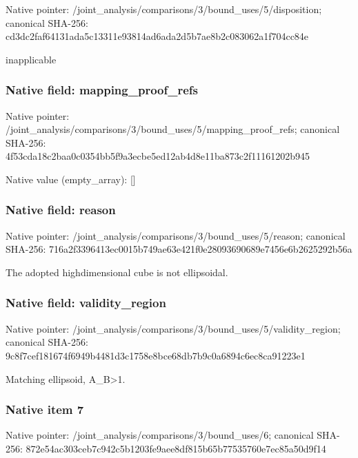 \documentclass[10pt,a4paper]{article}
\begin{document}
Native pointer: /joint\_analysis/comparis\allowbreak{}ons/3/bound\_uses/5/dispo\allowbreak{}sition; canonical SHA-256: cd3dc2faf64131ada5c13311\allowbreak{}e93814ad6ada2d5b7ae8b2c0\allowbreak{}83062a1f704cc84e


inapplicable


\subsubsection{Native field: mapping\_proof\_refs}


Native pointer: /joint\_analysis/comparis\allowbreak{}ons/3/bound\_uses/5/mappi\allowbreak{}ng\_proof\_refs; canonical SHA-256: 4f53cda18c2baa0c0354bb5f\allowbreak{}9a3ecbe5ed12ab4d8e11ba87\allowbreak{}3c2f11161202b945



Native value (empty\_array): []



\subsubsection{Native field: reason}


Native pointer: /joint\_analysis/comparis\allowbreak{}ons/3/bound\_uses/5/reaso\allowbreak{}n; canonical SHA-256: 716a2f3396413ec0015b749a\allowbreak{}e63e421f0e28093690689e74\allowbreak{}56e6b2625292b56a


The adopted highdimensional cube is not ellipsoidal.


\subsubsection{Native field: validity\_region}


Native pointer: /joint\_analysis/comparis\allowbreak{}ons/3/bound\_uses/5/valid\allowbreak{}ity\_region; canonical SHA-256: 9c8f7cef181674f6949b4481\allowbreak{}d3c1758e8bce68db7b9c0a68\allowbreak{}94c6ec8ca91223e1


Matching ellipsoid, A\_B>1.


\subsubsection{Native item 7}


Native pointer: /joint\_analysis/comparis\allowbreak{}ons/3/bound\_uses/6; canonical SHA-256: 872e54ac303ceb7c942c5b12\allowbreak{}03fe9aee8df815b65b775357\allowbreak{}60e7ec85a50d9f14
\end{document}

